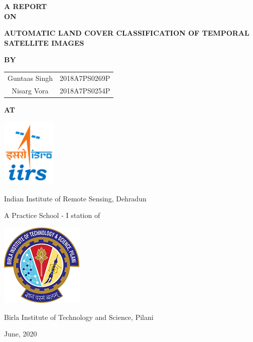 \documentclass[12pt, a4paper]{report}
\begin{document}
\pagestyle{empty}
\begin{titlepage}
\vspace*{0.2cm}
\begin{center} \textbf{A REPORT\\ON} \end{center}
\begin{center} \textbf{{\Large AUTOMATIC LAND COVER CLASSIFICATION OF TEMPORAL SATELLITE IMAGES}} \end{center}
\begin{center} \textbf{BY} \end{center}
\begin{center} 
{\Large 
	\begin{tabular}{c c}
	Guntaas Singh & 2018A7PS0269P\\
	Nisarg Vora & 2018A7PS0254P
	\end{tabular}
}
\end{center}
\begin{center} \textbf{AT} \end{center}
\begin{center} \includegraphics{iirs.png} \end{center}
\begin{center} {\Large Indian Institute of Remote Sensing, Dehradun} \end{center}
\begin{center} A Practice School - I station of \end{center}
\begin{center} {\includegraphics{bits.png}} \end{center}
\begin{center} {\Large Birla Institute of Technology and Science, Pilani} \end{center}
\begin{center} June, 2020 \end{center}
\end{titlepage}
\pagebreak
\end{document}
